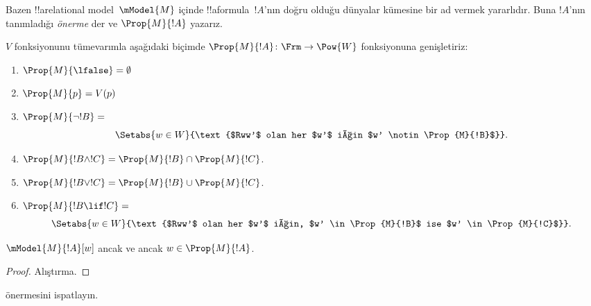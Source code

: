\documentclass[../../../include/open-logic-section]{subfiles}
\begin{document}


Bazen !!a{relational model}~$\mModel{M}$ içinde !!a{formula}~$!A$'nın
doğru olduğu dünyalar kümesine bir ad vermek yararlıdır. Buna $!A$'nın
tanımladığı \emph{önerme} der ve $\Prop{M}{!A}$ yazarız.

\begin{defn}
  $V$ fonksiyonunu tümevarımla aşağıdaki biçimde $\Prop{M}{!A} \colon \Frm
  \to \Pow{W}$ fonksiyonuna genişletiriz:
  \begin{enumerate}
  \item $\Prop{M}{\lfalse} = \emptyset$
  \item $\Prop{M}{p} = V(p)$
  \item $\Prop{M}{\lnot !B} = {}$
    \[
      \Setabs{w \in W}{\text{$Rww'$ olan her $w'$ için $w'
          \notin \Prop{M}{!B}$}}.
    \]
  \item $\Prop{M}{!B \land !C} = \Prop{M}{!B} \cap \Prop{M}{!C}$.
  \item $\Prop{M}{!B \lor !C} = \Prop{M}{!B} \cup \Prop{M}{!C}$.
  \item $\Prop{M}{!B \lif !C} = {}$
    \[
      \Setabs{w \in W}{\text{$Rww'$ olan her $w'$ için, $w'
          \in \Prop{M}{!B}$ ise $w' \in \Prop{M}{!C}$}}.
    \]
  \end{enumerate}
\end{defn}

\begin{prop}
  $\mModel{M}{!A}[w]$ ancak ve ancak $w \in \Prop{M}{!A}$.
\end{prop}

\begin{proof}
  Alıştırma.
\end{proof}

\begin{prob}
   önermesini ispatlayın.
\end{prob}
\end{document}
